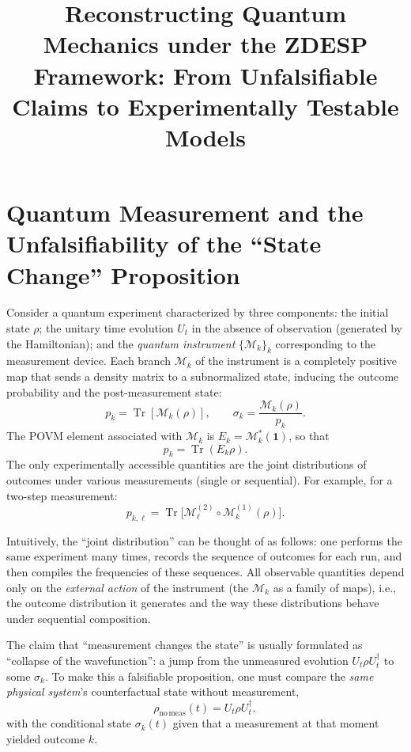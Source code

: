 \documentclass[12pt,a4paper]{article}
\begin{document}
	
	\title{Reconstructing Quantum Mechanics under the ZDESP Framework: From Unfalsifiable Claims to Experimentally Testable Models}
	\author{}
	\date{}
	\maketitle
	
	\section{Quantum Measurement and the Unfalsifiability of the ``State Change'' Proposition}
	
	Consider a quantum experiment characterized by three components: the initial state $\rho$; the unitary time evolution $U_t$ in the absence of observation (generated by the Hamiltonian); and the \emph{quantum instrument} $\{\mathcal M_k\}_k$ corresponding to the measurement device. Each branch $\mathcal M_k$ of the instrument is a completely positive map that sends a density matrix to a subnormalized state, inducing the outcome probability and the post-measurement state:
	\[
	p_k = \operatorname{Tr}[\mathcal M_k(\rho)], \qquad
	\sigma_k = \frac{\mathcal M_k(\rho)}{p_k}.
	\]
	The POVM element associated with $\mathcal M_k$ is $E_k = \mathcal M_k^{\ast}(\mathbf 1)$, so that
	\[
	p_k = \operatorname{Tr}(E_k \rho).
	\]
	The only experimentally accessible quantities are the joint distributions of outcomes under various measurements (single or sequential). For example, for a two-step measurement:
	\[
	p_{k,\ell} = \operatorname{Tr}\!\big[ \mathcal M_\ell^{(2)} \circ \mathcal M_k^{(1)} (\rho) \big].
	\]
	
	Intuitively, the ``joint distribution'' can be thought of as follows: one performs the same experiment many times, records the sequence of outcomes for each run, and then compiles the frequencies of these sequences. All observable quantities depend only on the \emph{external action} of the instrument (the $\mathcal M_k$ as a family of maps), i.e., the outcome distribution it generates and the way these distributions behave under sequential composition.
	
	The claim that ``measurement changes the state'' is usually formulated as ``collapse of the wavefunction'': a jump from the unmeasured evolution $U_t \rho U_t^\dagger$ to some $\sigma_k$. To make this a falsifiable proposition, one must compare the \emph{same physical system}'s counterfactual state without measurement,
	\[
	\rho_{\mathrm{no\,meas}}(t) = U_t \rho U_t^\dagger,
	\]
	with the conditional state $\sigma_k(t)$ given that a measurement at that moment yielded outcome $k$.
	
\end{document}

